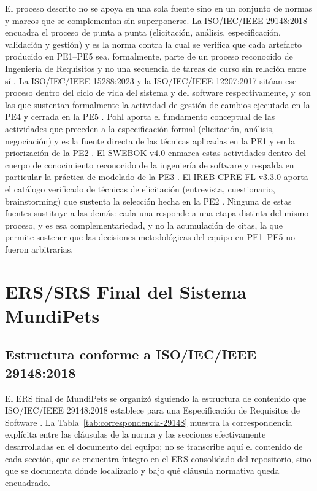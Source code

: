 \documentclass[journal,onecolumn]{IEEEtran}
\begin{document}
	El proceso descrito no se apoya en una sola fuente sino en un conjunto de normas y marcos
	que se complementan sin superponerse. La ISO/IEC/IEEE 29148:2018 encuadra el proceso de punta a punta (elicitación, análisis, especificación, validación y gestión) y es la
	norma contra la cual se verifica que cada artefacto producido en PE1--PE5 sea,
	formalmente, parte de un proceso reconocido de Ingeniería de Requisitos y no una secuencia
	de tareas de curso sin relación entre sí \cite{ieee29148}. La ISO/IEC/IEEE 15288:2023 y la
	ISO/IEC/IEEE 12207:2017 sitúan ese proceso dentro del ciclo de vida del sistema y del
	software respectivamente, y son las que sustentan formalmente la actividad de gestión de
	cambios ejecutada en la PE4 y cerrada en la PE5 \cite{iso15288,iso12207}. Pohl aporta el
	fundamento conceptual de las actividades que preceden a la especificación formal (elicitación, análisis, negociación) y es la fuente directa de las técnicas aplicadas en
	la PE1 y en la priorización de la PE2 \cite{pohl2025}. El SWEBOK v4.0 enmarca estas
	actividades dentro del cuerpo de conocimiento reconocido de la ingeniería de software y
	respalda en particular la práctica de modelado de la PE3 \cite{swebok2024}. El IREB CPRE FL
	v3.3.0 aporta el catálogo verificado de técnicas de elicitación (entrevista, cuestionario,
	brainstorming) que sustenta la selección hecha en la PE2 \cite{ireb2026}. Ninguna de estas
	fuentes sustituye a las demás: cada una responde a una etapa distinta del mismo proceso, y
	es esa complementariedad, y no la acumulación de citas, la que permite sostener que las
	decisiones metodológicas del equipo en PE1--PE5 no fueron arbitrarias.
	
	\newpage
	
	\section{ERS/SRS Final del Sistema MundiPets}
	\label{sec:ers-final}
	
	\subsection{Estructura conforme a ISO/IEC/IEEE 29148:2018}
	\label{sec:estructura-29148}
	
	El ERS final de MundiPets se organizó siguiendo la estructura de contenido que
	ISO/IEC/IEEE 29148:2018 establece para una Especificación de Requisitos de
	Software \cite{ieee29148}. La Tabla~\ref{tab:correspondencia-29148} muestra la
	correspondencia explícita entre las cláusulas de la norma y las secciones
	efectivamente desarrolladas en el documento del equipo; no se transcribe aquí
	el contenido de cada sección, que se encuentra íntegro en el ERS consolidado
	del repositorio, sino que se documenta dónde localizarlo y bajo qué cláusula
	normativa queda encuadrado.
	
\end{document}
